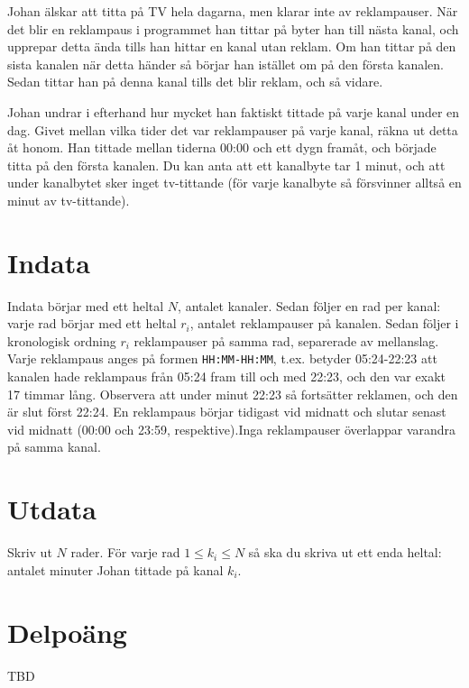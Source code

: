 
Johan älskar att titta på TV hela dagarna, men klarar inte av reklampauser. När det blir en reklampaus i programmet han tittar på byter han till nästa kanal, och upprepar detta ända tills han hittar en kanal utan reklam. Om han tittar på den sista kanalen när detta händer så börjar han istället om på den första kanalen. Sedan tittar han på denna kanal tills det blir reklam, och så vidare.

Johan undrar i efterhand hur mycket han faktiskt tittade på varje kanal under en dag. Givet mellan vilka tider det var reklampauser på varje kanal, räkna ut detta åt honom. Han tittade mellan tiderna 00:00 och ett dygn framåt, och började titta på den första kanalen. Du kan anta att ett kanalbyte tar 1 minut, och att under kanalbytet sker inget tv-tittande (för varje kanalbyte så försvinner alltså en minut av tv-tittande).

\section*{Indata}
Indata börjar med ett heltal $N$, antalet kanaler. Sedan följer en rad per kanal: varje rad börjar med ett heltal $r_i$, antalet reklampauser på kanalen. Sedan följer i kronologisk ordning $r_i$ reklampauser på samma rad, separerade av mellanslag. Varje reklampaus anges på formen \texttt{HH:MM-HH:MM}, t.ex. betyder 05:24-22:23 att kanalen hade reklampaus från 05:24 fram till och med 22:23, och den var exakt 17 timmar lång. Observera att under minut 22:23 så fortsätter reklamen, och den är slut först 22:24. En reklampaus börjar tidigast vid midnatt och slutar senast vid midnatt (00:00 och 23:59, respektive).Inga reklampauser överlappar varandra på samma kanal.

\section*{Utdata}
Skriv ut $N$ rader. För varje rad $1 \leq k_i \leq N$ så ska du skriva ut ett enda heltal: antalet minuter Johan tittade på kanal $k_i$.

\section*{Delpoäng}
TBD
